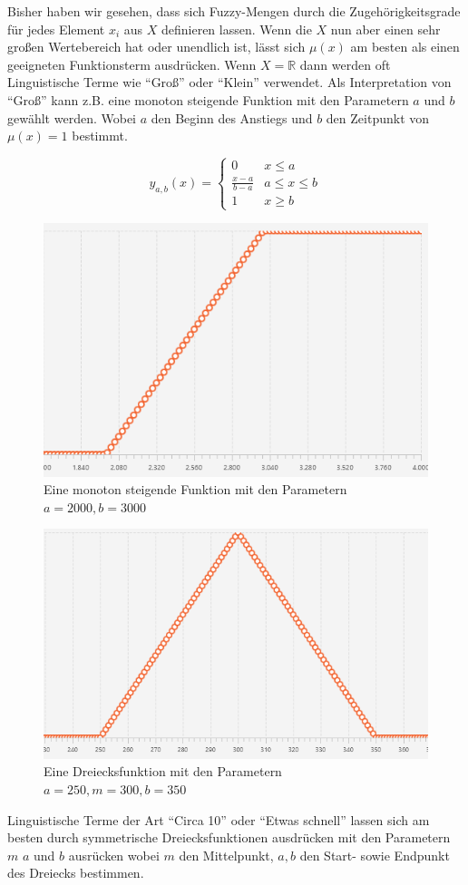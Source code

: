 \documentclass[12pt,a4paper,bibliography=totocnumbered,listof=totocnumbered, abstracton]{scrartcl}
\theoremstyle{Umgebung}
\begin{document}
Bisher haben wir gesehen, dass sich Fuzzy-Mengen durch die Zugehörigkeitsgrade für jedes Element $x_i$ aus $X$ definieren lassen. Wenn die $X$ nun aber einen sehr großen Wertebereich hat oder unendlich ist, lässt sich $\mu(x)$ am besten als einen geeigneten Funktionsterm ausdrücken. Wenn $X = \mathbb{R}$ dann werden oft Linguistische Terme wie \enquote{Groß} oder \enquote{Klein} verwendet. Als Interpretation von \enquote{Groß} kann z.B. eine monoton steigende Funktion mit den Parametern $a$ und $b$ gewählt werden. Wobei $a$ den Beginn des Anstiegs und $b$ den Zeitpunkt von $\mu(x) = 1$ bestimmt.

\begin{equation}
y_{a,b}(x)=\begin{cases}
0				& x \leq a \\
\frac{x-a}{b-a} & a \leq x \leq b \\
1 				& x \geq b 
\end{cases}
\end{equation}


\begin{figure}
	\centering
	\includegraphics[width=0.5\linewidth]{img/opentriangle}
	\caption{Eine monoton steigende Funktion mit den Parametern $a=2000, b = 3000$}
	\label{fig:opentriangle}
\end{figure}

\begin{figure}
	\centering
	\includegraphics[width=0.5\linewidth]{img/triangle}
	\caption{Eine Dreiecksfunktion mit den Parametern $a=250, m = 300,  b = 350$}
	\label{fig:triangle}
\end{figure}

Linguistische Terme der Art \enquote{Circa 10} oder \enquote{Etwas schnell} lassen sich am besten durch symmetrische Dreiecksfunktionen ausdrücken mit den Parametern $m$ $a$ und $b$ ausrücken wobei $m$ den Mittelpunkt, $a, b$ den Start- sowie Endpunkt des Dreiecks bestimmen.
\end{document}
